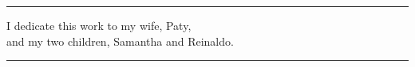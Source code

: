 \null
\vfill


\begin{center}
\noindent\rule[2pt]{0.1\textwidth}{1pt}
I dedicate this work to my wife, Paty, \\
and my two children, Samantha and
Reinaldo.
\noindent\rule[2pt]{0.1\textwidth}{1pt}
\end{center}


\vfill

\clearpage
